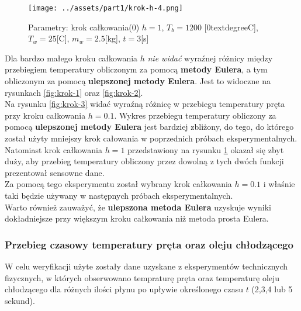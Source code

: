 \documentclass[
	12pt, %
]{fphw}
\begin{document}
\begin{figure}[H]
	\texttt{[image: ../assets/part1/krok-h-4.png]}
	\caption{Parametry: krok całkowania(0) \(h = 1\), \(T_b = 1200\) [\(0\)textdegree{}C], \(T_w = 25\)[\textdegree{}C], \(m_w = 2.5\)[kg], \(t = 3\)[s]}
	\label{fig:krok-4}
\end{figure}

Dla bardzo małego kroku całkowania \(h\) \textit{nie widać} wyraźnej różnicy między przebiegiem temperatury
obliczonym za pomocą \textbf{metody Eulera}, a tym obliczonym za pomocą \textbf{ulepszonej metody Eulera}.
Jest to widoczne na rysunkach \ref{fig:krok-1} oraz \ref{fig:krok-2}.\\
Na rysunku \ref{fig:krok-3} widać wyraźną różnicę w przebiegu temperatury pręta przy kroku całkowania \(h = 0.1\).
Wykres przebiegu temperatury obliczony za pomocą \textbf{ulepszonej metody Eulera} jest bardziej zbliżony,
do tego, do którego został użyty mniejszy krok całowania w poprzednich próbach eksperymentalnych. \\
Natomiast krok całkowania \(h = 1\) przedstawiony na rysunku \ref{fig:krok-4} okazał się zbyt duży,
aby przebieg temperatury obliczony przez dowolną z tych dwóch funkcji prezentował sensowne dane. \\
Za pomocą tego eksperymentu został wybrany krok całkowania \(h = 0.1\) i właśnie taki będzie używany
w następnych próbach eksperymentalnych. \\
Warto również zauważyć, że \textbf{ulepszona metoda Eulera} uzyskuje wyniki dokładniejsze
przy większym kroku całkowania niż metoda prosta Eulera.

\newpage

\subsubsection{Przebieg czasowy temperatury pręta oraz oleju chłodzącego}

W celu weryfikacji użyte zostały dane uzyskane z eksperymentów technicznych
fizycznych, w których obserwowano tempraturę pręta oraz temperaturę oleju chłodzącego
dla różnych ilości płynu po upływie określonego czasu \(t\) (2,3,4 lub 5 sekund).
\end{document}
